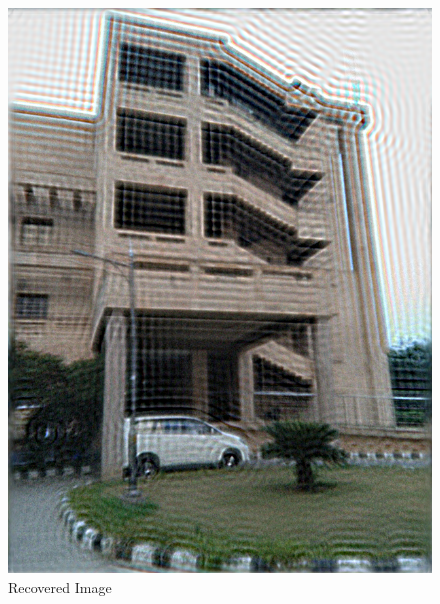 \documentclass{article}
\begin{document}
\begin{figure}[!htb]
      \includegraphics[scale=0.35]{./real_world/bharti/final.png}
      \caption{Recovered Image}
    \endminipage\hfill
    \end{figure}
    \pagebreak
    
\end{document}
